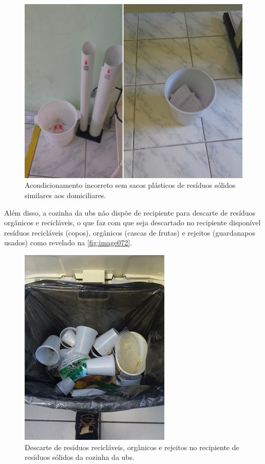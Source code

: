 \begin{figure}
	\centering
	\includegraphics[width=0.75\linewidth]{produtos/prodtres/image070_71}
	\caption{Acondicionamento incorreto sem sacos plásticos de resíduos sólidos similares aos domiciliares.}
	\label{fig:image070_71}
\end{figure}


Além disso, a cozinha da \gls{ubs} não dispõe de recipiente para descarte de resíduos orgânicos e recicláveis, o que faz com que seja descartado no recipiente disponível resíduos recicláveis (copos), orgânicos (cascas de frutas) e rejeitos (guardanapos usados) como revelado na \autoref{fig:image072}. 

\begin{figure}
	\centering
	\includegraphics[width=0.40\linewidth]{produtos/prodtres/image072}
	\caption{Descarte de resíduos recicláveis, orgânicos e rejeitos no recipiente de resíduos sólidos da cozinha da \gls{ubs}.}
	\label{fig:image072}
\end{figure}


